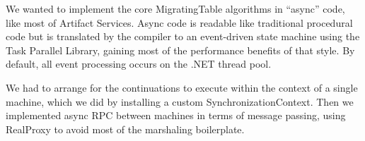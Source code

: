 We wanted to implement the core MigratingTable algorithms in \csharp ``async'' code, like most of Artifact Services.  Async code is readable like traditional procedural code but is translated by the compiler to an event-driven state machine using the Task Parallel Library, gaining most of the performance benefits of that style.  By default, all event processing occurs on the .NET thread pool.

We had to arrange for the continuations to execute within the context of a single \psharp machine, which we did by installing a custom SynchronizationContext.  Then we implemented async RPC between machines in terms of message passing, using RealProxy to avoid most of the marshaling boilerplate.
